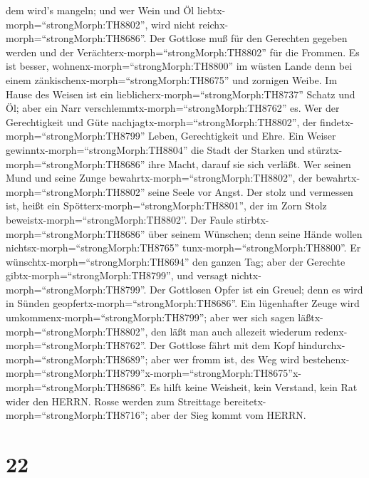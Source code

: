 dem wird's mangeln; und wer Wein und Öl
liebtx-morph=``strongMorph:TH8802'', wird nicht
reichx-morph=``strongMorph:TH8686''.  Der Gottlose muß für
den Gerechten gegeben werden und der
Verächterx-morph=``strongMorph:TH8802'' für die Frommen. 
Es ist besser, wohnenx-morph=``strongMorph:TH8800'' im wüsten Lande denn
bei einem zänkischenx-morph=``strongMorph:TH8675'' und zornigen Weibe.
 Im Hause des Weisen ist ein
lieblicherx-morph=``strongMorph:TH8737'' Schatz und Öl; aber ein Narr
verschlemmtx-morph=``strongMorph:TH8762'' es.  Wer der
Gerechtigkeit und Güte nachjagtx-morph=``strongMorph:TH8802'', der
findetx-morph=``strongMorph:TH8799'' Leben, Gerechtigkeit und Ehre.
 Ein Weiser gewinntx-morph=``strongMorph:TH8804'' die Stadt
der Starken und stürztx-morph=``strongMorph:TH8686'' ihre Macht, darauf
sie sich verläßt.  Wer seinen Mund und seine Zunge
bewahrtx-morph=``strongMorph:TH8802'', der
bewahrtx-morph=``strongMorph:TH8802'' seine Seele vor Angst.
 Der stolz und vermessen ist, heißt ein
Spötterx-morph=``strongMorph:TH8801'', der im Zorn Stolz
beweistx-morph=``strongMorph:TH8802''.  Der Faule
stirbtx-morph=``strongMorph:TH8686'' über seinem Wünschen; denn seine
Hände wollen nichtsx-morph=``strongMorph:TH8765''
tunx-morph=``strongMorph:TH8800''.  Er
wünschtx-morph=``strongMorph:TH8694'' den ganzen Tag; aber der Gerechte
gibtx-morph=``strongMorph:TH8799'', und versagt
nichtx-morph=``strongMorph:TH8799''.  Der Gottlosen Opfer
ist ein Greuel; denn es wird in Sünden
geopfertx-morph=``strongMorph:TH8686''.  Ein lügenhafter
Zeuge wird umkommenx-morph=``strongMorph:TH8799''; aber wer sich sagen
läßtx-morph=``strongMorph:TH8802'', den läßt man auch allezeit wiederum
redenx-morph=``strongMorph:TH8762''.  Der Gottlose fährt
mit dem Kopf hindurchx-morph=``strongMorph:TH8689''; aber wer fromm ist,
des Weg wird
bestehenx-morph=``strongMorph:TH8799''\textbar x-morph=``strongMorph:TH8675''x-morph=``strongMorph:TH8686''.
 Es hilft keine Weisheit, kein Verstand, kein Rat wider den
HERRN.  Rosse werden zum Streittage
bereitetx-morph=``strongMorph:TH8716''; aber der Sieg kommt vom HERRN.

\hypertarget{section-21}{%
\section{22}\label{section-21}}

